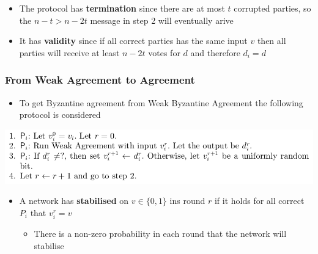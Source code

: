 \documentclass[11pt]{article}
\begin{document}
\begin{itemize}
\item The protocol has \textbf{termination} since there are at most \(t\) corrupted parties, so the \(n-t > n-2t\) message in step 2 will eventually arive
\item It has \textbf{validity} since if all correct parties has the same input \(v\) then all parties will receive at least \(n-2t\) votes for \(d\) and therefore \(d_i = d\)
\end{itemize}

\subsubsection{From Weak Agreement to Agreement}
\label{sec:org3f82a27}
\begin{itemize}
\item To get Byzantine agreement from Weak Byzantine Agreement the following protocol is considered
\end{itemize}
\begin{center}
\includegraphics[width=.9\linewidth]{Asynchronous Agreement (8)/screenshot_2018-09-29_17-58-43.png}
\end{center}

\begin{itemize}
\item A network has \textbf{stabilised} on \(v \in \{0,1\}\) ins round \(r\) if it holds for all correct \(P_i\) that \(v_i^r=v\)
\begin{itemize}
\item There is a non-zero probability in each round that the network will stabilise
\end{itemize}
\end{itemize}
\end{document}

